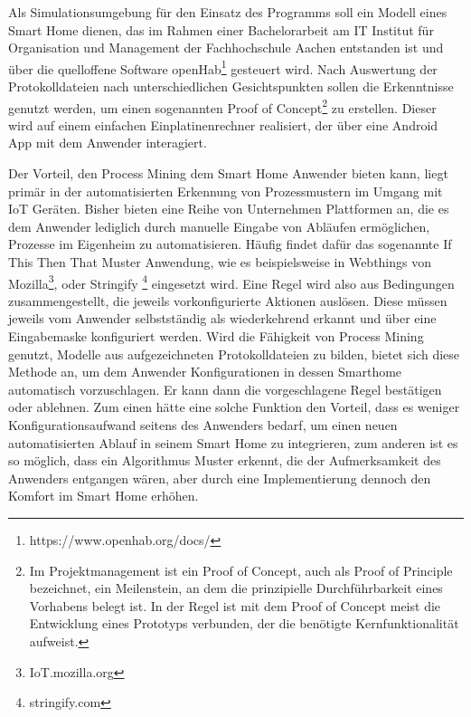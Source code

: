 Als Simulationsumgebung für den Einsatz des Programms soll ein Modell eines Smart Home dienen, das im Rahmen einer Bachelorarbeit am IT Institut für Organisation und Management der Fachhochschule Aachen entstanden ist und über die quelloffene Software openHab\footnote{https://www.openhab.org/docs/} gesteuert wird. Nach Auswertung der Protokolldateien nach unterschiedlichen Gesichtspunkten sollen die Erkenntnisse genutzt werden, um einen sogenannten Proof of Concept\footnote{Im Projektmanagement ist ein Proof of Concept, auch als Proof of Principle bezeichnet, ein Meilenstein, an dem die prinzipielle Durchführbarkeit eines Vorhabens belegt ist. In der Regel ist mit dem Proof of Concept meist die Entwicklung eines Prototyps verbunden, der die benötigte Kernfunktionalität aufweist.\cite{poc}} zu erstellen. Dieser wird auf einem einfachen Einplatinenrechner realisiert, der über eine Android App mit dem Anwender interagiert.

Der Vorteil, den Process Mining dem Smart Home Anwender bieten kann, liegt primär in der automatisierten Erkennung von Prozessmustern im Umgang mit IoT Geräten. Bisher bieten eine Reihe von Unternehmen Plattformen an, die es dem Anwender lediglich durch manuelle Eingabe von Abläufen ermöglichen, Prozesse im Eigenheim zu automatisieren. Häufig findet dafür das sogenannte If This Then That Muster Anwendung, wie es beispielsweise in Webthings von Mozilla\footnote{IoT.mozilla.org},  oder Stringify \footnote{stringify.com} eingesetzt wird. 
\newpage
Eine Regel wird also aus Bedingungen zusammengestellt, die jeweils vorkonfigurierte Aktionen auslösen. Diese müssen jeweils vom Anwender selbstständig als wiederkehrend erkannt und über eine Eingabemaske konfiguriert werden. Wird die Fähigkeit von Process Mining genutzt, Modelle aus aufgezeichneten Protokolldateien zu bilden, bietet sich diese Methode an, um dem Anwender Konfigurationen in dessen Smarthome automatisch vorzuschlagen. Er kann dann die vorgeschlagene Regel bestätigen oder ablehnen. Zum einen hätte eine solche Funktion den Vorteil, dass es weniger Konfigurationsaufwand seitens des Anwenders bedarf, um einen neuen automatisierten Ablauf in seinem Smart Home zu integrieren, zum anderen ist es so möglich, dass ein Algorithmus Muster erkennt, die der Aufmerksamkeit des Anwenders entgangen wären, aber durch eine Implementierung dennoch den Komfort im Smart Home erhöhen.


